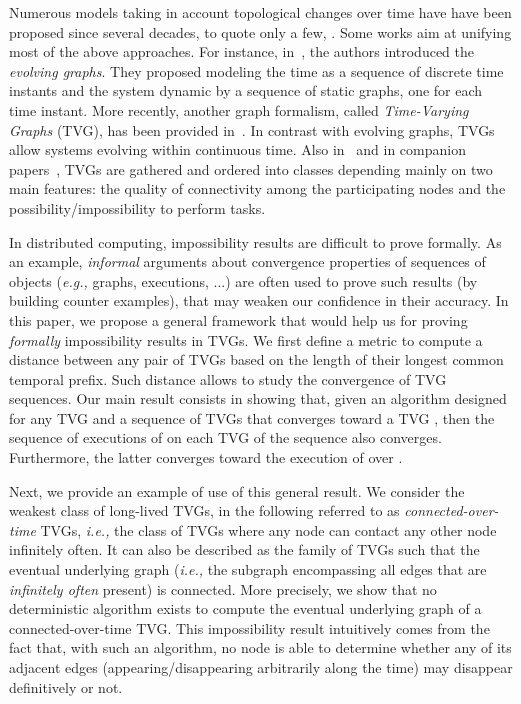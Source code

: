 \documentclass[11pt]{article}
\newcommand{\ie}{{\em i.e.,}\xspace}
\newcommand{\eg}{{\em e.g.,}\xspace}
\begin{document}
Numerous models taking in account topological changes over time have have been proposed since several decades, to
quote only a few, \cite{AKMUV12,AE84,CCF09,F03,F04,FGM07,SW09}. Some works aim at unifying most of the above
approaches. For instance, in~\cite{XFJ03}, the authors introduced the {\em evolving graphs}. They proposed modeling
the time as a sequence of discrete time instants and the system dynamic by a sequence of static graphs, one for each
time instant. More recently, another graph formalism, called {\em Time-Varying Graphs} (TVG), has been provided
in~\cite{CFQS12}. In contrast with evolving graphs, TVGs allow systems evolving within continuous time. Also
in~\cite{CFQS12} and in companion papers~\cite{CFMS10,CFMS12}, TVGs are gathered and ordered into classes depending
mainly on two main features: the quality of connectivity among the participating nodes and the
possibility/impossibility to perform tasks.

In distributed computing, impossibility results are difficult to prove formally. As an example, \emph{informal} arguments about convergence properties of sequences of objects (\eg graphs, executions, ...) are often used to prove such results (by building counter examples), that may weaken our confidence in their accuracy. In this paper, we propose a general framework that would help us for proving \emph{formally} impossibility results in TVGs. We first define a metric to compute a distance between any pair of TVGs based on the length of their longest common temporal prefix. Such distance allows to study the convergence of TVG sequences. Our main result consists in showing that, given an algorithm  designed for any TVG and a sequence of TVGs that converges toward a TVG , then the sequence of executions of  on each TVG of the sequence also converges. Furthermore, the latter converges toward the execution of  over . 

Next, we provide an example of use of this general result. We consider the weakest class of long-lived TVGs, in the
following referred to as \emph{connected-over-time} TVGs, \ie the class of TVGs where any node can contact any other node infinitely often. It can also be described as the family of TVGs such that the eventual underlying graph (\ie the subgraph encompassing all edges that are \emph{infinitely often} present) is connected. More precisely, we show that no deterministic algorithm exists to compute the eventual underlying graph of a connected-over-time TVG. This impossibility result intuitively comes from the fact that, with such an algorithm, no node is able to determine whether any of its adjacent edges (appearing/disappearing arbitrarily along the time) may disappear definitively or not.
\end{document}

